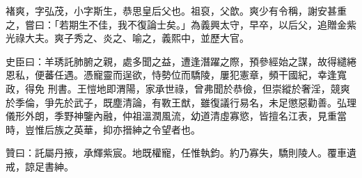 \begin{pinyinscope}
 褚爽，字弘茂，小字斯生，恭思皇后父也。祖裒，父歆。爽少有令稱，謝安甚重之，嘗曰：「若期生不佳，我不復論士矣。」為義興太守，早卒，以后父，追贈金紫光祿大夫。爽子秀之、炎之、喻之，義熙中，並歷大官。



 史臣曰：羊琇託肺腑之親，處多聞之益，遭逢潛躍之際，預參經始之謀，故得繾綣恩私，便蕃任遇。憑寵靈而逞欲，恃勢位而驕陵，屢犯憲章，頻干國紀，幸逢寬政，得免
 刑書。王愷地即渭陽，家承世祿，曾弗聞於恭儉，但崇縱於奢淫，競爽於季倫，爭先於武子，既塵清論，有斁王猷，雖復議行易名，未足懲惡勸善。弘理儀形外朗，季野神鑒內融，仲祖溫潤風流，幼道清虛寡慾，皆擅名江表，見重當時，豈惟后族之英華，抑亦搢紳之令望者也。



 贊曰：託屬丹掖，承輝紫宸。地既權寵，任惟執鈞。約乃寡失，驕則陵人。覆車遺戒，諒足書紳。



\end{pinyinscope}